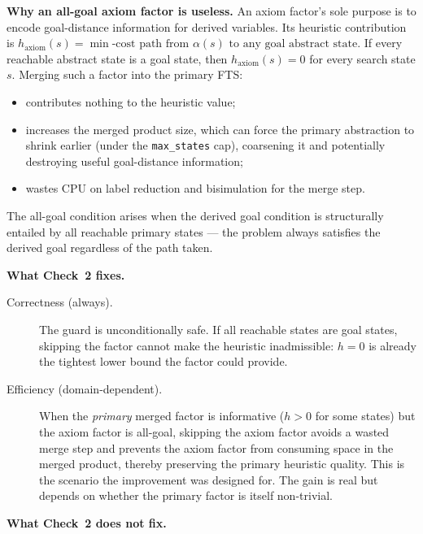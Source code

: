 \documentclass[11pt,a4paper]{article}
\begin{document}
\noindent\textbf{Why an all-goal axiom factor is useless.}
An axiom factor's sole purpose is to encode goal-distance information for
derived variables.  Its heuristic contribution is
$h_{\mathrm{axiom}}(s) = \min\text{-cost path from }\alpha(s)\text{ to any
goal abstract state}$.
If every reachable abstract state is a goal state, then
$h_{\mathrm{axiom}}(s) = 0$ for every search state $s$.  Merging such a factor
into the primary FTS:
\begin{itemize}
  \item contributes nothing to the heuristic value;
  \item increases the merged product size, which can force the primary
        abstraction to shrink earlier (under the \texttt{max\_states} cap),
        coarsening it and potentially destroying useful goal-distance
        information;
  \item wastes CPU on label reduction and bisimulation for the merge step.
\end{itemize}
The all-goal condition arises when the derived goal condition is structurally
entailed by all reachable primary states — the problem always satisfies the
derived goal regardless of the path taken.

\medskip
\noindent\textbf{What Check~2 fixes.}

\begin{description}
  \item[Correctness (always).] The guard is unconditionally safe.  If all
    reachable states are goal states, skipping the factor cannot make the
    heuristic inadmissible: $h = 0$ is already the tightest lower bound the
    factor could provide.

  \item[Efficiency (domain-dependent).] When the \emph{primary} merged factor
    is informative ($h > 0$ for some states) but the axiom factor is all-goal,
    skipping the axiom factor avoids a wasted merge step and prevents the axiom
    factor from consuming space in the merged product, thereby preserving the
    primary heuristic quality.  This is the scenario the improvement was
    designed for.  The gain is real but depends on whether the primary factor is
    itself non-trivial.
\end{description}

\medskip
\noindent\textbf{What Check~2 does not fix.}
\end{document}
